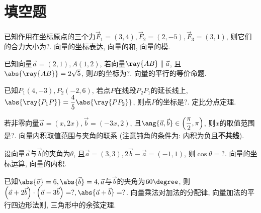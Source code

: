 \documentclass[8pt]{article}
\author{\Author}
\title{\Title}
\date{}
\begin{document}
	\maketitle

	\section{填空题}
		\begin{easonproblem}
			已知作用在坐标原点的三个力\(\vec{F}_1 = (3, 4), \vec{F}_2 = (2, -5), \vec{F}_3 = (3, 1)\), 则它们的合力大小为?.
			\subproblem
			 向量的坐标表达, 向量的和, 向量的模.
		\end{easonproblem}

		\begin{easonproblem}
			已知向量\(\vec{a} = (2, 1), A (1, 2)\), 若向量\(\ray{AB} \parallel \vec{a}\), 且\(\abs{\ray{AB}} = 2\sqrt{5}\), 则\(B\)的坐标为?.
			\subproblem
			 向量的平行的等价命题.
		\end{easonproblem}
		
		\begin{easonbigproblem}
			已知\(P_1 (4, -3), P_2 (-2, 6)\), 若点\(P\)在线段\(P_2 P_1\)的延长线上, \(\abs{\ray{P_1 P}} = \dfrac{4}{5} \abs{\ray{P P_2}}\), 则点\(P\)的坐标是?.
			\subbigproblem
			 定比分点定理.
		\end{easonbigproblem}

		\begin{easonbigproblem}
			若非零向量\(\vec{a} = (x, 2x), \vec{b} = (-3x, 2)\), 且\(\ang{\vec{a}, \vec{b}} \in \left(\dfrac{\pi}{2}, \pi\right)\), 则\(x\)的取值范围是?.
			\subbigproblem
			 向量内积取值范围与夹角的联系 (注意钝角的条件为: 内积为负且\textbf{不共线}).
		\end{easonbigproblem}

		\begin{easonproblem}
			设向量\(\vec{a}\)与\(\vec{b}\)的夹角为\(\theta\), 且\(\vec{a} = (3, 3), 2\vec{b} - \vec{a} = (-1, 1)\), 则\(\cos \theta = ?\).
			\subproblem
			 向量的坐标运算, 向量的内积.
		\end{easonproblem}

		\begin{easonproblem}
			已知\(\abs{\vec{a}} = 6, \abs{\vec{b}} = 4, \vec{a}\)与\(\vec{b}\)的夹角为\(60\degree\), 则\(\left(\vec{a} + 2\vec{b}\right)\cdot\left(\vec{a} - 3\vec{b}\right) = ?, \abs{\vec{a} + \vec{b}} = ?\).
			\subproblem
			 向量乘法对加法的分配律, 向量加法的平行四边形法则, 三角形中的余弦定理.
		\end{easonproblem}
\end{document}

